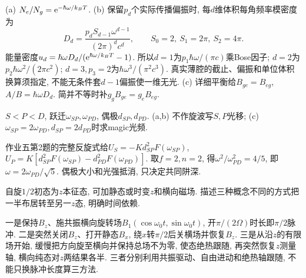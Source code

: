 \begin{solution}(a) $N_e/N_g=\mathrm e^{-\hbar\omega/k_BT}$. (b) 保留$p_d$个实际传播偏振时, 每$d$维体积每角频率模密度为
\[D_d=\frac{p_dS_{d-1}\omega^{d-1}}{(2\pi)^dc^d},\qquad S_0=2,\ S_1=2\pi,\ S_2=4\pi.\]
 能量密度$u_d=\hbar\omega D_d/(\mathrm e^{\hbar\omega/k_BT}-1)$. 所以$d=1$为$p_1\hbar\omega/(\pi c)$乘Bose因子; $d=2$为$p_2\hbar\omega^2/(2\pi c^2)$; $d=3,p_3=2$为$\hbar\omega^3/(\pi^2c^3)$. 真实薄腔的截止、偏振和单位体积换算须指定, 不能无条件套$d-1$偏振使一维无光. (c) 详细平衡给$B_{ge}=B_{eg}$,$A/B=\hbar\omega D_d$. 简并不等时补$g_gB_{ge}=g_eB_{eg}$.
\end{solution}
\begin{exercise}$S<P<D$, 跃迁$\omega_{SP},\omega_{PD}$, 偶极$d_{SP},d_{PD}$. (a,b) 不作旋波写$S,P$光移; (c) $\omega_{SP}=2\omega_{PD},d_{SP}=2d_{PD}$时求magic光频.\end{exercise}
\begin{solution}作业五第2题的完整反旋式给$U_S=-Kd_{SP}^2F(\omega_{SP})$,$U_P=K[d_{SP}^2F(\omega_{SP})-d_{PD}^2F(\omega_{PD})]$. 取$f=2,n=2$, 得$\omega^2/\omega_{PD}^2=4/5$, 即$\omega=2\omega_{PD}/\sqrt5$. 偶极大小和光强抵消, 只决定共同阱深.
\end{solution}
\begin{exercise}自旋$1/2$初态为$z$本征态, 可加静态或时变$z$和横向磁场. 描述三种概念不同的方式把一半布居转至另一$z$态, 明确时间依赖.\end{exercise}
\begin{solution}一是保持$B_z$、施共振横向旋转场$B_1(\cos\omega_0t,\sin\omega_0t)$, 开$\pi/(2\Omega)$时长即$\pi/2$脉冲. 二是突然关闭$B_z$、打开静态$B_x$, 绕$x$转$\pi/2$后关横场并恢复$B_z$. 三是从沿$z$的有限场开始, 缓慢把方向旋至横向并保持总场不为零, 使态绝热跟随, 再突然恢复$z$测量轴, 横向纯态对$z$两结果各半. 三者分别利用共振驱动、自由进动和绝热轴跟随, 不能只换脉冲长度算三方法.
\end{solution}

